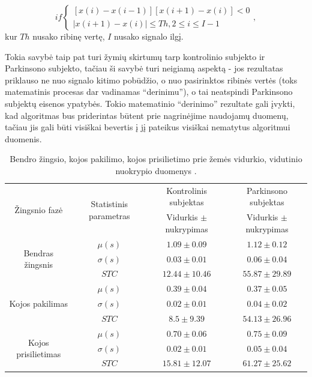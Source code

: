 \documentclass[]{vgtuef}
\begin{document}
\begin{equation}
 if \left\{ \begin{array}{l}
 	[x(i)-x(i-1)][x(i+1)-x(i)] < 0 \\
 	|x(i+1)-x(i)| \leq Th, 2 \leq i \leq I-1
 \end{array} \right. ,
\end{equation}
kur $Th$ nusako ribinę vertę, $I$ nusako signalo ilgį.

Tokia savybė taip pat turi žymių skirtumų tarp kontrolinio subjekto ir Parkinsono subjekto, tačiau ši savybė turi neigiamą aspektą - jos rezultatas priklauso ne nuo signalo kitimo pobūdžio, o nuo pasirinktos ribinės vertės (toks matematinis procesas dar vadinamas ``derinimu''), o tai neatspindi Parkinsono subjektų eisenos ypatybės. Tokio matematinio ``derinimo'' rezultate gali įvykti, kad algoritmas bus priderintas būtent prie nagrinėjime naudojamų duomenų, tačiau jis gali būti visiškai bevertis į jį pateikus visiškai nematytus algoritmui duomenis.

\begin{table}
  \centering
  \caption{Bendro žingsio, kojos pakilimo, kojos prisilietimo prie žemės vidurkio, vidutinio nuokrypio duomenys \cite{5280353}.}
  \label{table:gait_corr_params}
  \renewcommand{\arraystretch}{1.3}
	\begin{tabular}{|c|c|c|c|} \hline
		 \multirow{2}{*}{Žingsnio fazė} & 
		 \multirow{2}{*}{Statistinis parametras} & Kontrolinis subjektas & Parkinsono subjektas \\ 	\cline{3-4}
		 & & Vidurkis $\pm$ nukrypimas & Vidurkis $\pm$ nukrypimas \\ \hline
		 \multirow{3}{*}{Bendras žingsnis} 
		 	& $\mu(s)$    & $1.09 \pm 0.09$   & $1.12 \pm 0.12$ \\ \cline{2-4}
		 	& $\sigma(s)$ & $0.03 \pm 0.01$   & $0.06 \pm 0.04$ \\ \cline{2-4} 
		 	& $STC$       & $12.44 \pm 10.46$ & $55.87 \pm 29.89$ \\ \hline
		 \multirow{3}{*}{Kojos pakilimas}
	 	 	& $\mu(s)$    & $0.39 \pm 0.04$   & $0.37 \pm 0.05$ \\ \cline{2-4}
		 	& $\sigma(s)$ & $0.02 \pm 0.01$   & $0.04 \pm 0.02$ \\ \cline{2-4} 
		 	& $STC$       & $8.5 \pm 9.39$    & $54.13 \pm 26.96$ \\ \hline
		 \multirow{3}{*}{Kojos prisilietimas}
		 	& $\mu(s)$    & $0.70 \pm 0.06$   & $0.75 \pm 0.09$ \\ \cline{2-4}
		 	& $\sigma(s)$ & $0.02 \pm 0.01$   & $0.05 \pm 0.04$ \\ \cline{2-4} 
		 	& $STC$       & $15.81 \pm 12.07$ & $61.27 \pm 25.62$ \\ \hline
	\end{tabular}
\end{table}
\end{document}
